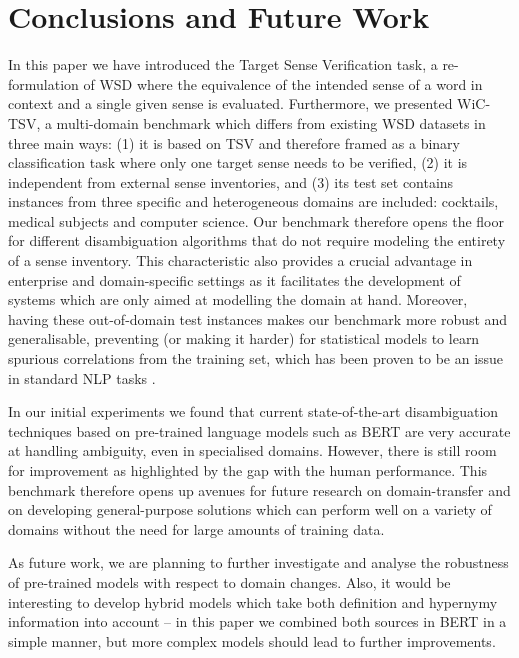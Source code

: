 \documentclass[11pt,a4paper]{article}
\begin{document}
\section{Conclusions and Future Work}
\label{conclusion}

In this paper we have introduced the Target Sense Verification task, a re-formulation of WSD where the equivalence of the intended sense of a word in context and a single given sense is evaluated. Furthermore, we presented WiC-TSV, a multi-domain benchmark which differs from existing WSD datasets in three main ways: (1) it is based on TSV and therefore framed as a binary classification task where only one target sense needs to be verified, (2) it is independent from external sense inventories, and (3) its test set contains instances from three specific and heterogeneous domains are included: cocktails, medical subjects and computer science. 
Our benchmark therefore opens the floor for different disambiguation algorithms that do not require modeling the entirety of a sense inventory.
This characteristic also provides a crucial advantage in enterprise and domain-specific settings
as it facilitates the development of systems which are only aimed at modelling the domain at hand. 
Moreover, having these out-of-domain test instances makes our benchmark more robust and generalisable, preventing (or making it harder) for statistical models to learn spurious correlations from the training set, which has been proven to be an issue in standard NLP tasks \cite{poliak-etal-2018-hypothesis,gururangan-etal-2018-annotation,linzen2020can}.

In our initial experiments we found that current state-of-the-art disambiguation techniques based on pre-trained language models such as BERT are very accurate at handling ambiguity, even in specialised domains. However, there is still room for improvement as highlighted by the gap with the human performance. 
This benchmark therefore opens up avenues for future research on domain-transfer and on developing general-purpose solutions which can perform well on a variety of domains without the need for large amounts of training data. 


As future work, we are planning to further investigate and analyse the robustness of pre-trained models with respect to domain changes.
Also, it would be interesting to develop hybrid models which take both definition and hypernymy information into account -- in this paper we combined both sources in BERT in a simple manner, but more complex models should lead to further improvements.










\end{document}
